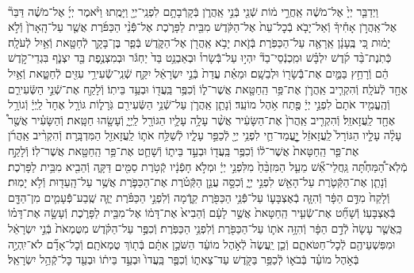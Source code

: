 \documentclass[twoside, openany, parskip=half, 11pt]{book}
\begin{document}
\begin{footnotesize}
\begin{multicols}{2}
\\
וַיְדַבֵּ֤ר יְיָ֙ אֶל־מֹשֶׁ֔ה אַֽחֲרֵ֣י מ֔וֹת שְֿׁנֵ֖י בְּֿנֵ֣י אַֽהֲרֹ֑ן בְּֿקָרְֿבָתָ֥ם לִפְנֵֽי־יְיָ֖ וַיָּמֻֽתוּ׃ וַיֹּ֨אמֶר יְיָ֜ אֶל־מֹשֶׁ֗ה דַּבֵּר֘ אֶל־אַֽהֲרֹ֣ן אָחִ֒יךָ֒ וְֿאַל־יָבֹ֤א בְֿכׇל־עֵת֙ אֶל־הַקֹּ֔דֶשׁ מִבֵּ֖ית לַפָּרֹ֑כֶת אֶל־פְּֿֿנֵ֨י הַכַּפֹּ֜רֶת אֲשֶׁ֤ר עַל־הָֽאָרֹן֙ וְֿלֹ֣א יָמ֔וּת כִּ֚י בֶּֽעָנָ֔ן אֵֽרָאֶ֖ה עַל־הַכַּפֹּֽרֶת׃ בְּֿזֹ֛את יָבֹ֥א אַֽהֲרֹ֖ן אֶל־הַקֹּ֑דֶשׁ בְּֿפַ֧ר בֶּן־בָּקָ֛ר לְֿחַטָּ֖את וְֿאַ֥יִל לְֿעֹלָֽה׃ כְּֿתֹֽנֶת־בַּ֨ד קֹ֜דֶשׁ יִלְבָּ֗שׁ וּמִֽכְנְֿסֵי־בַד֘ יִהְי֣וּ עַל־בְּֿֿשָׂרוֹ֒ וּבְאַבְנֵ֥ט בַּד֙ יַחְגֹּ֔ר וּבְמִצְנֶ֥פֶת בַּ֖ד יִצְנֹ֑ף בִּגְדֵי־קֹ֣דֶשׁ הֵ֔ם וְֿרָחַ֥ץ בַּמַּ֛יִם אֶת־בְּֿֿשָׂר֖וֹ וּלְבֵשָֽׁם׃ וּמֵאֵ֗ת עֲדַת֙ בְּֿנֵ֣י יִשְׂרָאֵ֔ל יִקַּ֛ח שְֿׁנֵֽי־שְֿֿׂעִירֵ֥י עִזִּ֖ים לְֿחַטָּ֑את וְֿאַ֥יִל אֶחָ֖ד לְֿעֹלָֽה׃ וְֿהִקְרִ֧יב אַֽהֲרֹ֛ן אֶת־פַּ֥ר הַֽחַטָּ֖את אֲשֶׁר־ל֑וֹ וְֿכִפֶּ֥ר בַּֽעֲד֖וֹ וּבְעַ֥ד בֵּיתֽוֹ׃  וְֿלָקַ֖ח אֶת־שְֿׁנֵ֣י הַשְּֿׂעִירִ֑ם וְֿהֶֽעֱמִ֤יד אֹתָם֙ לִפְנֵ֣י יְיָ֔ פֶּ֖תַח אֹ֥הֶל מוֹעֵֽד׃ וְֿנָתַ֧ן אַֽהֲרֹ֛ן עַל־שְֿׁנֵ֥י הַשְּֿׂעִירִ֖ם גֹּֽרָל֑וֹת גּוֹרָ֤ל אֶחָד֙ לַֽיְיָ֔ וְֿגוֹרָ֥ל אֶחָ֖ד לַֽעֲזָאזֵֽל׃ וְֿהִקְרִ֤יב אַֽהֲרֹן֙ אֶת־הַשָּׂעִ֔יר אֲשֶׁ֨ר עָלָ֥ה עָלָ֛יו הַגּוֹרָ֖ל לַֽיְיָ֑ וְֿעָשָׂ֖הוּ חַטָּֽאת׃ וְֿהַשָּׂעִ֗יר אֲשֶׁ֖ר֩ עָלָ֨ה עָלָ֤יו הַגּוֹרָל֙ לַֽעֲזָאזֵ֔ל יׇׇׇׇׇׇׇׇׇׇׇׇׇׇׇׇׇׇׇׇָֽעֳמַד־חַ֛י לִפְנֵ֥י יְיָ֖ לְֿכַפֵּ֣ר עָלָ֑יו לְֿשַׁלַּ֥ח אֹת֛וֹ לַֽעֲזָאזֵ֖ל הַמִּדְבָּֽרָה׃ וְֿהִקְרִ֨יב אַֽהֲרֹ֜ן אֶת־פַּ֤ר הַֽחַטָּאת֙ אֲשֶׁר־ל֔וֹ וְֿכִפֶּ֥ר בַּֽעֲד֖וֹ וּבְעַ֣ד בֵּית֑וֹ וְֿשָׁחַ֛ט אֶת־פַּ֥ר הַֽחַטָּ֖את אֲשֶׁר־לֽוֹ׃  וְֿלָקַ֣ח מְֿלֹֽא־הַ֠מַּחְתָּ֠ה גַּֽחֲלֵי־אֵ֞שׁ מֵעַ֤ל הַמִּזְבֵּ֨חַ֙ מִלִּפְנֵ֣י יְיָ֔ וּמְלֹ֣א חָפְֿנָ֔יו קְֿטֹ֥רֶת סַמִּ֖ים דַּקָּ֑ה וְֿהֵבִ֖יא מִבֵּ֥ית לַפָּרֹֽכֶת׃ וְֿנָתַ֧ן אֶת־הַקְּֿטֹ֛רֶת עַל־הָאֵ֖שׁ לִפְנֵ֣י יְיָ֑ וְֿכִסָּ֣ה עֲנַ֣ן הַקְּֿטֹ֗רֶת אֶת־הַכַּפֹּ֛רֶת אֲשֶׁ֥ר עַל־הָֽעֵד֖וּת וְֿלֹ֥א יָמֽוּת׃ וְֿלָקַח֙ מִדַּ֣ם הַפָּ֔ר וְֿהִזָּ֧ה בְֿאֶצְבָּע֛וֹ עַל־פְּֿֿנֵ֥י הַכַּפֹּ֖רֶת קֵ֑דְֿמָה וְֿלִפְנֵ֣י הַכַּפֹּ֗רֶת יַזֶּ֧ה שֶֽׁבַע־פְּֿֿעָמִ֛ים מִן־הַדָּ֖ם בְּֿאֶצְבָּעֽוֹ׃ וְֿשָׁחַ֞ט אֶת־שְֿׂעִ֤יר הַֽחַטָּאת֙ אֲשֶׁ֣ר לָעָ֔ם וְֿהֵבִיא֙ אֶת־דָּמ֔וֹ אֶל־מִבֵּ֖ית לַפָּרֹ֑כֶת וְֿעָשָׂ֣ה אֶת־דָּמ֗וֹ כַּֽאֲשֶׁ֤ר עָשָׂה֙ לְֿדַ֣ם הַפָּ֔ר וְֿהִזָּ֥ה אֹת֛וֹ עַל־הַכַּפֹּ֖רֶת וְֿלִפְנֵ֥י הַכַּפֹּֽרֶת׃ וְֿכִפֶּ֣ר עַל־הַקֹּ֗דֶשׁ מִטֻּמְאֹת֙ בְּֿנֵ֣י יִשְׂרָאֵ֔ל וּמִפִּשְׁעֵיהֶ֖ם לְֿכׇל־חַטֹּאתָ֑ם וְֿכֵ֤ן יַֽעֲשֶׂה֙ לְֿאֹ֣הֶל מוֹעֵ֔ד הַשֹּׁכֵ֣ן אִתָּ֔ם בְּֿת֖וֹךְ טֻמְאֹתָֽם׃ וְֿכׇל־אָדָ֞ם לֹא־יִֽהְיֶ֣ה בְּֿאֹ֣הֶל מוֹעֵ֗ד בְּֿבֹא֛וֹ לְֿכַפֵּ֥ר בַּקֹּ֖דֶשׁ עַד־צֵאת֑וֹ וְֿכִפֶּ֤ר בַּֽעֲדוֹ֙ וּבְעַ֣ד בֵּית֔וֹ וּבְעַ֖ד כׇּל־קְֿהַ֥ל יִשְׂרָאֵֽל׃


\end{multicols}
\end{footnotesize}
\end{document}
